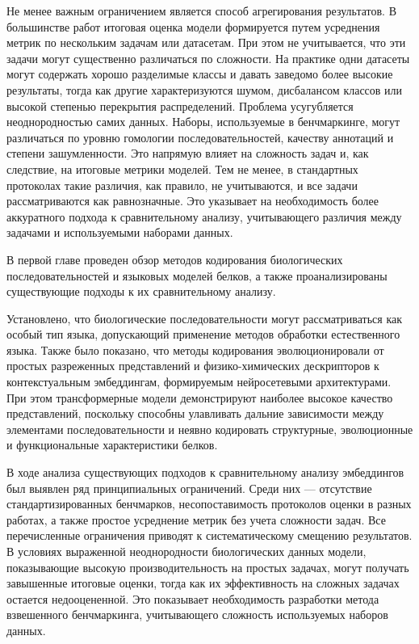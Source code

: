 \documentclass[specification,annotation,times]{itmo-student-thesis}
\begin{document}
Не менее важным ограничением является способ агрегирования результатов. В большинстве работ итоговая оценка модели формируется путем усреднения метрик по нескольким задачам или датасетам. При этом не учитывается, что эти задачи могут существенно различаться по сложности. На практике одни датасеты могут содержать хорошо разделимые классы и давать заведомо более высокие результаты, тогда как другие характеризуются шумом, дисбалансом классов или высокой степенью перекрытия распределений.
Проблема усугубляется неоднородностью самих данных. Наборы, используемые в бенчмаркинге, могут различаться по уровню гомологии последовательностей, качеству аннотаций и степени зашумленности. Это напрямую влияет на сложность задач и, как следствие, на итоговые метрики моделей. Тем не менее, в стандартных протоколах такие различия, как правило, не учитываются, и все задачи рассматриваются как равнозначные.
Это указывает на необходимость более аккуратного подхода к сравнительному анализу, учитывающего различия между задачами и используемыми наборами данных.

\chapterconclusion

В первой главе проведен обзор методов кодирования биологических последовательностей и языковых моделей белков, 
а также проанализированы существующие подходы к их сравнительному анализу.

Установлено, что биологические последовательности могут рассматриваться как особый тип языка, 
допускающий применение методов обработки естественного языка. Также было показано, что методы кодирования эволюционировали 
от простых разреженных представлений и физико-химических дескрипторов к контекстуальным эмбеддингам, формируемым нейросетевыми архитектурами. 
При этом трансформерные модели демонстрируют наиболее высокое качество представлений, 
поскольку способны улавливать дальние зависимости между элементами последовательности и неявно кодировать структурные, 
эволюционные и функциональные характеристики белков.

В ходе анализа существующих подходов к сравнительному анализу эмбеддингов был выявлен ряд принципиальных ограничений. 
Среди них --- отсутствие стандартизированных бенчмарков, несопоставимость протоколов оценки в разных работах, 
а также простое усреднение метрик без учета сложности задач.
Все перечисленные ограничения приводят к систематическому смещению результатов. 
В условиях выраженной неоднородности биологических данных модели, 
показывающие высокую производительность на простых задачах, 
могут получать завышенные итоговые оценки, 
тогда как их эффективность на сложных задачах остается недооцененной. 
Это показывает необходимость разработки метода взвешенного бенчмаркинга, учитывающего сложность используемых наборов данных.
\end{document}
